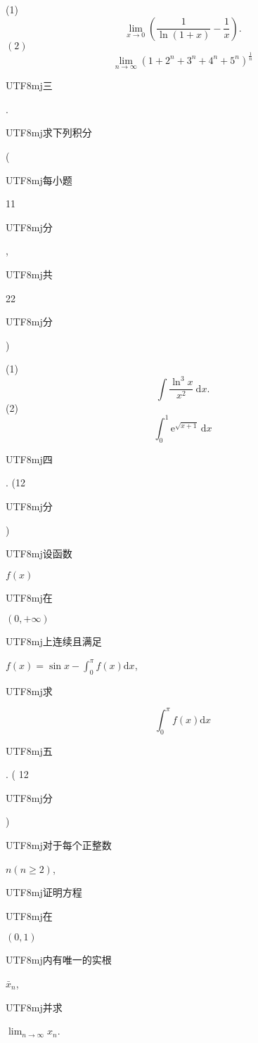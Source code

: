 \documentclass[10pt]{article}
\begin{document}
(1)
$$
\lim _{x \rightarrow 0}\left(\frac{1}{\ln (1+x)}-\frac{1}{x}\right) .
$$
$(2)$
$$
\lim _{n \rightarrow \infty}\left(1+2^{n}+3^{n}+4^{n}+5^{n}\right)^{\frac{1}{n}}
$$
\begin{CJK}{UTF8}{mj}三\end{CJK}. \begin{CJK}{UTF8}{mj}求下列积分\end{CJK} (\begin{CJK}{UTF8}{mj}每小题\end{CJK} 11 \begin{CJK}{UTF8}{mj}分\end{CJK}, \begin{CJK}{UTF8}{mj}共\end{CJK} 22 \begin{CJK}{UTF8}{mj}分\end{CJK})

(1)
$$
\int \frac{\ln ^{3} x}{x^{2}} \mathrm{~d} x .
$$
(2)
$$
\int_{0}^{1} \mathrm{e}^{\sqrt{x+1}} \mathrm{~d} x
$$
\begin{CJK}{UTF8}{mj}四\end{CJK}. (12 \begin{CJK}{UTF8}{mj}分\end{CJK}) \begin{CJK}{UTF8}{mj}设函数\end{CJK} $f(x)$ \begin{CJK}{UTF8}{mj}在\end{CJK} $(0,+\infty)$ \begin{CJK}{UTF8}{mj}上连续且满足\end{CJK} $f(x)=\sin x-\int_{0}^{\pi} f(x) \mathrm{d} x$, \begin{CJK}{UTF8}{mj}求\end{CJK}
$$
\int_{0}^{\pi} f(x) \mathrm{d} x
$$
\begin{CJK}{UTF8}{mj}五\end{CJK}. ( 12 \begin{CJK}{UTF8}{mj}分\end{CJK}) \begin{CJK}{UTF8}{mj}对于每个正整数\end{CJK} $n(n \geqslant 2)$, \begin{CJK}{UTF8}{mj}证明方程\end{CJK}

\begin{CJK}{UTF8}{mj}在\end{CJK} $(0,1)$ \begin{CJK}{UTF8}{mj}内有唯一的实根\end{CJK} $\bar{x}_{n}$, \begin{CJK}{UTF8}{mj}并求\end{CJK} $\lim _{n \rightarrow \infty} x_{n}$.
\end{document}
